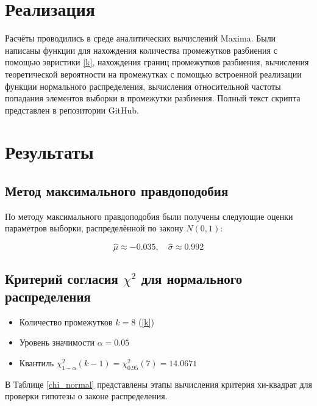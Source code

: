 \documentclass[12pt]{article}
\begin{document}
\begin{flushleft}
\newpage

\section{Реализация}

	Расчёты проводились в среде аналитических вычислений Maxima. Были написаны функции для нахождения количества промежутков разбиения с помощью эвристики \ref{k}, нахождения границ промежутков разбиения, вычисления теоретической вероятности на промежутках с помощью встроенной реализации функции нормального распределения, вычисления относительной частоты попадания элементов выборки в промежутки разбиения. Полный текст скрипта представлен в репозитории GitHub.

\newpage

\section{Результаты}

	\subsection{Метод максимального правдоподобия}

		По методу максимального правдоподобия были получены следующие оценки параметров выборки, распределённой по закону $N(0, 1)$:

		$$
			\hat{\mu} \approx -0.035 , \quad \hat{\sigma} \approx 0.992 
		$$

	\subsection{Критерий согласия $\chi^2$ для нормального распределения}

	\begin{itemize}
		\item Количество промежутков $k=8$ (\ref{k})
		\item Уровень значимости $\alpha = 0.05$
		\item Квантиль $\chi^2_{1-\alpha}(k-1) = \chi^2_{0.95}(7) = 14.0671$
	\end{itemize}

	В Таблице \ref{chi_normal} представлены этапы вычисления критерия хи-квадрат для проверки гипотезы о законе распределения.


\end{flushleft}
\end{document}
